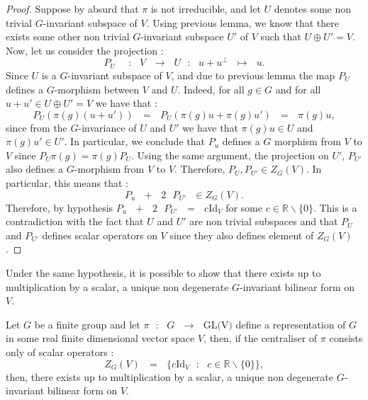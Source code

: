 \documentclass[envcountsame,envcountchap]{svmono}
\newcommand{\R}{\mathbb R}
\newcommand{\fct}[4]{\qq:\qq #1\qq\longrightarrow\qq #2\qq :\qq #3\qq \mapsto\qq #4}
\newcommand{\qq}{\text{ }}
\newcommand{\fctt}[2]{\qq:\qq#1\qq\rightarrow\qq#2}
\begin{document}
\begin{proof}
	Suppose by absurd that $\pi$ is not irreducible, and let $U$ denotes some non trivial $G$-invariant subspace of $V$. Using previous lemma, we know that there exists some other non trivial $G$-invariant subspace $U'$ of $V$ such that $U\oplus U'=V$.
	Now, let us consider the projection :
	\begin{equation}
	P_U\qq\fct{V}{U}{u+u^\perp}{u}.
	\end{equation}
	Since $U$ is a $G$-invariant subspace of $V$, and due to previous lemma the map $P_U$ defines a $G$-morphism between $V$ and $U$. Indeed, for all $g\in G$ and for all $u+u'\in U\oplus U'=V$ we have that :
	\begin{equation}
	P_U(\pi(g)(u+u'))\qq=\qq P_U(\pi(g)u+\pi(g)u')\qq=\qq \pi(g)u,
	\end{equation}
	since from the $G$-invariance of $U$ and $U'$ we have that $\pi(g)u\in U$ and $\pi(g)u'\in U'$. In particular, we conclude that $P_u$ defines a $G$ morphism from $V$ to $V$ since $P_U\pi(g)=\pi(g)P_U$. Using the same argument, the projection on $U'$,  $P_{U'}$ also defines a $G$-morphism from $V$ to $V$. Therefore, $P_U,P_{U'}\in Z_G(V)$. In particular, this means that :
	\begin{equation}
	P_u\qq+\qq 2\qq P_{U'}\qq \in Z_G(V).
	\end{equation}
	Therefore, by hypothesis $P_u\qq+\qq 2\qq P_{U'}\qq=\qq c\mbox{Id}_V$ for some $c\in \R\backslash\{0\}$. This is a contradiction with the fact that $U$ and $U'$ are non trivial subspaces and that $P_U$ and $P_{U'}$ defines scalar operators on $V$ since they also defines element of $Z_G(V)$.
\end{proof}
Under the same hypothesis, it is possible to show that there exists up to multiplication by a scalar, a unique non degenerate $G$-invariant bilinear form on $V$.
\begin{lemma}
		Let $G$ be a finite group and let $\pi \fctt{G}{\mbox{GL(V)}}$ define a representation of $G$ in some real finite dimensional vector space $V$, then, if the centraliser of $\pi$ consists only of scalar operators :
		\begin{equation}
		Z_G(V)\qq=\qq \{c\mbox{Id}_V\qq :\qq c\in \R\backslash\{0\}\},
		\end{equation}
		then, there exists up to multiplication by a scalar, a unique non degenerate $G$-invariant bilinear form on $V$.
\end{lemma}
\end{document}
